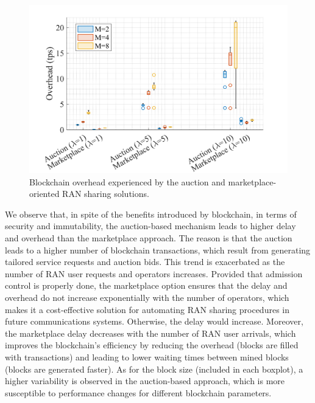 \documentclass[journal]{IEEEtran}
\begin{document}
	\begin{figure}[ht!]
		\centering
		\includegraphics[width=.85\linewidth]{overhead_new.png}
		\caption{Blockchain overhead experienced by the auction and marketplace-oriented RAN sharing solutions.}
		\label{fig:overhead}
	\end{figure}
	
	We observe that, in spite of the benefits introduced by blockchain, in terms of security and immutability, the auction-based mechanism leads to higher delay and overhead than the marketplace approach. The reason is that the auction leads to a higher number of blockchain transactions, which result from generating tailored service requests and auction bids. This trend is exacerbated as the number of RAN user requests and operators increases. Provided that admission control is properly done, the marketplace option ensures that the delay and overhead do not increase exponentially with the number of operators, which makes it a cost-effective solution for automating RAN sharing procedures in future communications systems. Otherwise, the delay would increase. Moreover, the marketplace delay decreases with the number of RAN user arrivals, which improves the blockchain's efficiency by reducing the overhead (blocks are filled with transactions) and leading to lower waiting times between mined blocks (blocks are generated faster). As for the block size (included in each boxplot), a higher variability is observed in the auction-based approach, which is more susceptible to performance changes for different blockchain parameters. %
	
\end{document}
